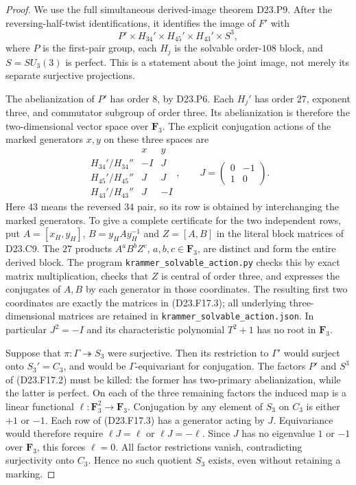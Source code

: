 \begin{proof}
We use the full simultaneous derived-image theorem
D23.P9.  After the reversing-half-twist identifications,
it identifies the image of $F'$ with
\[
 P'\times H_{34}'\times H_{45}'\times H_{43}'
       \times S^3,
\tag{D23.F17.2}
\]
where $P$ is the first-pair group, each $H_j$ is the
solvable order-$108$ block, and $S=SU_3(3)$ is
perfect.  This is a statement about the joint image,
not merely its separate surjective projections.

The abelianization of $P'$ has order $8$, by D23.P6.
Each $H_j'$ has order $27$, exponent three, and
commutator subgroup of order three.  Its abelianization
is therefore the two-dimensional vector space over
$\mathbf F_3$. The explicit conjugation actions of
the marked generators $x,y$ on these three spaces are
\[
 \begin{array}{c|cc}
 &x&y\\\hline
 H_{34}'/H_{34}''&-I&J\\
 H_{45}'/H_{45}''&J&J\\
 H_{43}'/H_{43}''&J&-I
 \end{array},\qquad
 J=\begin{pmatrix}0&-1\\1&0\end{pmatrix}.
\tag{D23.F17.3}
\]
Here $43$ means the reversed $34$ pair, so its row
is obtained by interchanging the marked generators.
To give a complete certificate for the two independent
rows, put $A=[x_H,y_H]$, $B=y_HAy_H^{-1}$ and
$Z=[A,B]$ in the literal block matrices of D23.C9.
The $27$ products $A^aB^bZ^c$, $a,b,c\in\mathbf F_3$,
are distinct and form the entire derived block.
The program \texttt{krammer\_solvable\_action.py}
checks this by exact matrix multiplication, checks
that $Z$ is central of order three, and expresses
the conjugates of $A,B$ by each generator in those
coordinates.  The resulting first two coordinates
are exactly the matrices in (D23.F17.3); all
underlying three-dimensional matrices are retained
in \texttt{krammer\_solvable\_action.json}.
In particular $J^2=-I$ and its characteristic
polynomial $T^2+1$ has no root in $\mathbf F_3$.

Suppose that $\pi:\Gamma\twoheadrightarrow S_3$
were surjective. Then its restriction to $\Gamma'$
would surject onto $S_3'=C_3$, and would be
$\Gamma$-equivariant for conjugation.  The factors
$P'$ and $S^3$ of (D23.F17.2) must be killed: the
former has two-primary abelianization, while the
latter is perfect. On each of the three remaining
factors the induced map is a linear functional
$\ell:\mathbf F_3^2\to\mathbf F_3$.
Conjugation by any element of $S_3$ on $C_3$ is
either $+1$ or $-1$.  Each row of (D23.F17.3) has
a generator acting by $J$. Equivariance would
therefore require $\ell J=\ell$ or
$\ell J=-\ell$. Since $J$ has no eigenvalue $1$
or $-1$ over $\mathbf F_3$, this forces $\ell=0$.
All factor restrictions vanish, contradicting
surjectivity onto $C_3$. Hence no such quotient
$S_3$ exists, even without retaining a marking.


\end{proof}
